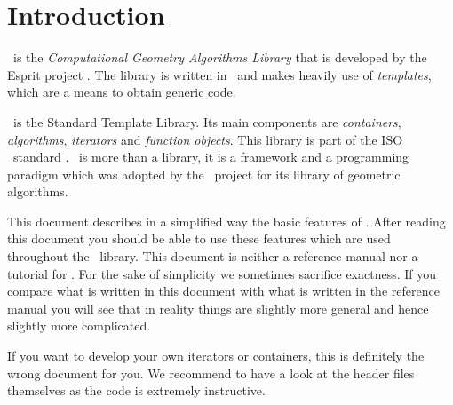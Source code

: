 

\cleardoublepage

\chapter{Introduction}

\cgal\ is the {\em Computational Geometry Algorithms Library} that is
developed by the {\sc Esprit} project \cgal.
The library is written in \CC\ and makes heavily use of {\em templates},
which are a means to obtain generic code.

\stl\  is the Standard Template Library. Its main components are {\em
containers}, {\em algorithms}, {\em iterators} and {\em function
objects}.  This library is part of the ISO \CC\ standard \cite{c-isplc-98}.
\stl\ is more than a library, it is a framework and a programming paradigm
which was adopted by the \cgal\ project for its library of geometric
algorithms.

This document describes in a simplified way the basic features of \stl.
After reading this document you should be able to use these features
which are used throughout the \cgal\ library.
This document is neither a reference manual nor a tutorial for \stl.
For the sake of simplicity we sometimes sacrifice exactness.
If you compare what is written in this document with what is written
in the reference manual you will see that in reality things are
slightly more general and hence slightly more complicated.

If you want to develop your own iterators or containers, this is 
definitely the wrong document for you.
We recommend to have a look at the header files themselves as the code is 
extremely instructive.

